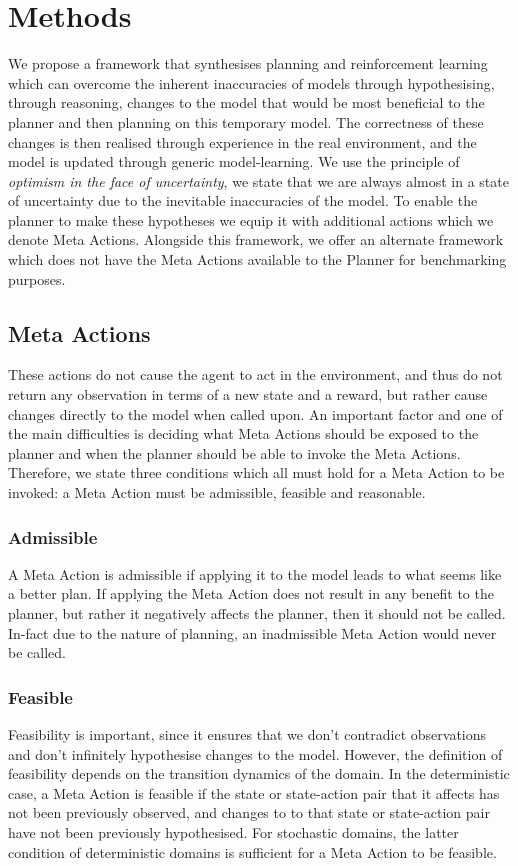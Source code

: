 \chapter{Methods}
\label{chapter4}
We propose a framework that synthesises planning and reinforcement learning which can overcome the inherent inaccuracies of models through hypothesising, through reasoning, changes to the model that would be most beneficial to the planner and then planning on this temporary model. The correctness of these changes is then realised through experience in the real environment, and the model is updated through generic model-learning.
We use the principle of \textit{optimism in the face of uncertainty}, we state that we are always almost in a state of uncertainty due to the inevitable inaccuracies of the model.
To enable the planner to make these hypotheses we equip it with additional actions which we denote Meta Actions.
Alongside this framework, we offer an alternate framework which does not have the Meta Actions available to the Planner for benchmarking purposes.
\section{Meta Actions}
These actions do not cause the agent to act in the environment, and thus do not return any observation in terms of a new state and a reward, but rather cause changes directly to the model when called upon. An important factor and one of the main difficulties is deciding what Meta Actions should be exposed to the planner and when the planner should be able to invoke the Meta Actions. Therefore, we state three conditions which all must hold for a Meta Action to be invoked: a Meta Action must be admissible, feasible and reasonable.
\subsection{Admissible}
A Meta Action is admissible if applying it to the model leads to what seems like a better plan. If applying the Meta Action does not result in any benefit to the planner, but rather it negatively affects the planner, then it should not be called. In-fact due to the nature of planning, an inadmissible Meta Action would never be called.
\subsection{Feasible}
Feasibility is important, since it ensures that we don't contradict observations and don't infinitely hypothesise changes to the model. However, the definition of feasibility depends on the transition dynamics of the domain. In the deterministic case, a Meta Action is feasible if the state or state-action pair that it affects has not been previously observed, and changes to to that state or state-action pair have not been previously hypothesised.
For stochastic domains, the latter condition of deterministic domains is sufficient for a Meta Action to be feasible.
